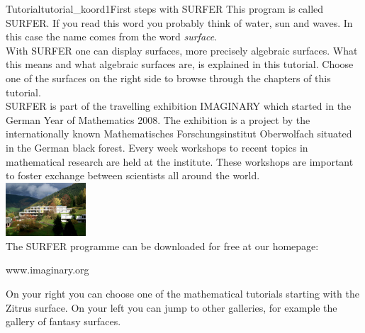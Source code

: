 \begin{surferIntroPage}{Tutorial}{tutorial_koord1}{First steps with SURFER}
This program is called SURFER. If you read this word you probably think of water, sun and waves. In this case the name comes from the word {\it surface}.
\\
With SURFER one can display surfaces, more precisely algebraic surfaces. What this means and what algebraic surfaces are, is explained in this tutorial. Choose one of the surfaces on the right side to browse through the chapters of this tutorial.\\
SURFER is part of the travelling exhibition IMAGINARY which started in the German Year of Mathematics 2008. The exhibition is a project by the internationally known Mathematisches Forschungsinstitut Oberwolfach situated in the German black forest. Every week workshops to recent topics in mathematical research are held at the institute. These workshops are important to foster exchange between scientists all around the world. \\
\vspace{0.2cm} \hspace{3.5cm}\includegraphics[width=3cm]{./../../common/images/photo_mfo.jpg}\\
The SURFER programme can be downloaded for free at our homepage: \\
\begin{centering}
www.imaginary.org\\
\end{centering}
 \vspace{0.2cm}
On your right you can choose one of the mathematical tutorials starting with the Zitrus surface. On your left you can jump to other galleries, for example the gallery of fantasy surfaces.
\end{surferIntroPage}
